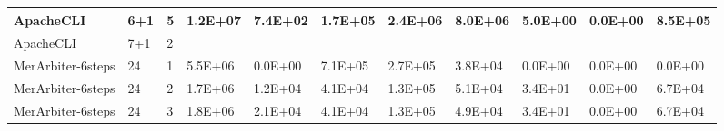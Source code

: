 \begin{table*}[]
\begin{tabular}{@{}lllllllllll@{}}
        ApacheCLI                                                & 6+1                                                     & 5    & 1.2E+07                                                     & 7.4E+02                                                               & 1.7E+05                                                 & 2.4E+06                                                    & 8.0E+06                                                        & 5.0E+00                                                & 0.0E+00                                                   & 8.5E+05 \\ \midrule
        ApacheCLI                                                & 7+1                                                     & 2    &                                                             &                                                                       &                                                         &                                                            &                                                                &                                                        &                                                           &         \\ \midrule \midrule
        MerArbiter-6steps                                        & 24                                                      & 1    & 5.5E+06                                                     & 0.0E+00                                                               & 7.1E+05                                                 & 2.7E+05                                                    & 3.8E+04                                                        & 0.0E+00                                                & 0.0E+00                                                   & 0.0E+00 \\ \midrule
        MerArbiter-6steps                                        & 24                                                      & 2    & 1.7E+06                                                     & 1.2E+04                                                               & 4.1E+04                                                 & 1.3E+05                                                    & 5.1E+04                                                        & 3.4E+01                                                & 0.0E+00                                                   & 6.7E+04 \\ \midrule
        MerArbiter-6steps                                        & 24                                                      & 3    & 1.8E+06                                                     & 2.1E+04                                                               & 4.1E+04                                                 & 1.3E+05                                                    & 4.9E+04                                                        & 3.4E+01                                                & 0.0E+00                                                   & 6.7E+04 \\ \midrule

\end{tabular}
\end{table*}
